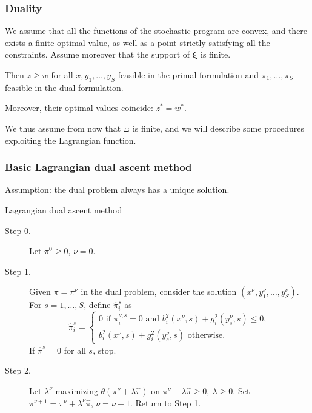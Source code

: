 \documentclass[french]{beamer}
\def\bxi{\boldsymbol\xi}
\begin{document}
\begin{frame}
\frametitle{Duality}

\begin{theorem}
We assume that all the functions of the stochastic program are convex,
and there exists a finite optimal value, as well as a point strictly satisfying all the constraints.
Assume moreover that the support of $\bxi$ is finite.

\mbox{}

Then $z \geq w$ for all $x, y_1,\ldots{},y_S$ feasible in the primal formulation and $\pi_1,\ldots{},\pi_S$ feasible in the dual formulation.

\mbox{}

Moreover, their optimal values coincide: $z^* = w^*$.
\end{theorem}

\mbox{}

We thus assume from now that {\red $\Xi$ is finite}, and we will describe some procedures exploiting the Lagrangian function.

\end{frame}

\begin{frame}
\frametitle{Basic Lagrangian dual ascent method}

Assumption: the dual problem always has a unique solution.

\begin{algo}{Lagrangian dual ascent method}
\begin{description}
\item[Step 0.] Let $\pi^0 \geq 0$, $\nu = 0$.
\item[Step 1.]
Given $\pi = \pi^{\nu}$ in the dual problem, consider the solution
$(x^{\nu}, y_1^{\nu},\ldots{},y_S^{\nu})$.
For $s = 1, \ldots{}, S$, define $\hat{\pi}_i^s$ as
\[
\hat{\pi}_i^s =
\begin{cases}
0 \mbox{ if }\pi_i^{\nu,s} = 0\text{ and }b_i^2(x^{\nu},s) +
g_i^2(y_s^{\nu},s) \leq 0,\\
b_i^2(x^{\nu},s) + g_i^2(y_s^{\nu},s) \mbox{ otherwise.}
\end{cases}
\]
If $\hat{\pi}^s = 0$ for all $s$, stop.
\item[Step 2.]
Let $\lambda^\nu$ maximizing $\theta(\pi^{\nu}+\lambda\hat{\pi})$ on $\pi^{\nu}+\lambda\hat{\pi} \geq 0,\ \lambda \geq 0$.
Set $\pi^{\nu+1} = \pi^{\nu} + \lambda^{\nu}\hat{\pi}$, $\nu = \nu+1$.
Return to Step 1.
\end{description}
\end{algo}

\end{frame}
\end{document}
